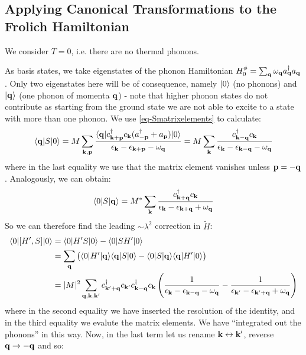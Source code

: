 \subsection{Applying Canonical Transformations to the Frolich Hamiltonian}
We consider $T = 0$, i.e. there are no thermal phonons.

As basis states, we take eigenstates of the phonon Hamiltonian $H^{\phi}_0 = \sum_{\mathbf{q}} \omega_{\mathbf{q}} a^\dagger_{\mathbf{q}} a_{\mathbf{q}}$. Only two eigenstates here will be of consequence, namely $\lvert 0 \rangle$ (no phonons) and $\lvert \mathbf{q} \rangle$ (one phonon of momenta $\mathbf{q}$) - note that higher phonon states do not contribute as starting from the ground state we are not able to excite to a state with more than one phonon. We use \eqref{eq-Smatrixelements} to calculate:
\begin{equation}
    \begin{split}
        \langle \mathbf{q} \rvert S\lvert 0 \rangle = M\sum_{\mathbf{k}, \mathbf{p}} \frac{\langle \mathbf{q} \rvert c^\dagger_{\mathbf{k} + \mathbf{p}}c_{\mathbf{k}}(a^\dagger_{-\mathbf{p}} + a_{\mathbf{p}})\lvert 0 \rangle}{\epsilon_{\mathbf{k}} - \epsilon_{\mathbf{k} + \mathbf{p}} - \omega_{\mathbf{q}}} = M\sum_{\mathbf{k}} \frac{c^\dagger_{\mathbf{k} - \mathbf{q}}c_{\mathbf{k}}}{\epsilon_{\mathbf{k}} - \epsilon_{\mathbf{k} - \mathbf{q}} - \omega_{\mathbf{q}}}
    \end{split}
\end{equation}
where in the last equality we use that the matrix element vanishes unless $\mathbf{p} = -\mathbf{q}$. Analogously, we can obtain:
\begin{equation}
    \langle 0 \rvert S\lvert \mathbf{q} \rangle = M^* \sum_{\mathbf{k}}\frac{c^\dagger_{\mathbf{k} + \mathbf{q}}c_{\mathbf{k}}}{\epsilon_{\mathbf{k}} - \epsilon_{\mathbf{k} + \mathbf{q}} + \omega_{\mathbf{q}}}
\end{equation}
So we can therefore find the leading $\sim \lambda^2$ correction in $\tilde{H}$:
\begin{equation}
    \begin{split}
        \langle 0 \rvert[H', S]\lvert 0 \rangle &= \langle 0 \rvert H'S\lvert 0 \rangle - \langle 0 \rvert SH'\lvert 0 \rangle
        \\ &= \sum_{\mathbf{q}}\left(\langle 0 \rvert H'\lvert \mathbf{q} \rangle\langle \mathbf{q} \rvert S\lvert 0 \rangle - \langle 0 \rvert S\lvert \mathbf{q} \rangle\langle \mathbf{q} \rvert H'\lvert 0 \rangle\right)
        \\ &= \lvert M \rvert^2\sum_{\mathbf{q}, \mathbf{k}, \mathbf{k}'}c^\dagger_{\mathbf{k}' + \mathbf{q}}c_{\mathbf{k'}}c^\dagger_{\mathbf{k} - \mathbf{q}}c_{\mathbf{k}}\left(\frac{1}{\epsilon_{\mathbf{k}} - \epsilon_{\mathbf{k} - \mathbf{q}} - \omega_{\mathbf{q}}} - \frac{1}{\epsilon_{\mathbf{k}'} - \epsilon_{\mathbf{k}' + \mathbf{q}} + \omega_{\mathbf{q}}}\right)
    \end{split}
\end{equation}
where in the second equality we have inserted the resolution of the identity, and in the third equality we evalute the matrix elements. We have ``integrated out the phonons'' in this way. Now, in the last term let us rename $\mathbf{k} \leftrightarrow \mathbf{k}'$, reverse $\mathbf{q} \to -\mathbf{q}$ and so:
